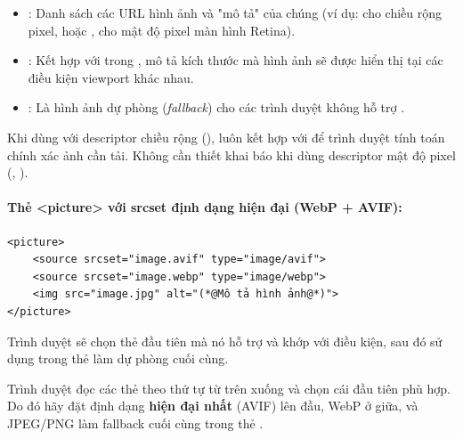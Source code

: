 \begin{itemize}[leftmargin=1.5em, itemsep=3pt, parsep=0pt]
    \item {}: Danh sách các URL hình ảnh và "mô tả" của chúng (ví dụ:  cho chiều rộng pixel, hoặc ,  cho mật độ pixel màn hình Retina).
    \item {}: Kết hợp với  trong , mô tả kích thước mà hình ảnh sẽ được hiển thị tại các điều kiện viewport khác nhau.
    \item {}: Là hình ảnh dự phòng (\textit{fallback}) cho các trình duyệt không hỗ trợ .
\end{itemize}

\begin{tipBox}
Khi dùng  với descriptor chiều rộng (), luôn kết hợp với  để trình duyệt tính toán chính xác ảnh cần tải. Không cần thiết khai báo  khi dùng descriptor mật độ pixel (, ).
\end{tipBox}

\paragraph{Thẻ <picture> với srcset định dạng hiện đại (WebP + AVIF):}

\begin{codeWindow}
\begin{lstlisting}[language=HTML5]
<picture>
    <source srcset="image.avif" type="image/avif">
    <source srcset="image.webp" type="image/webp">
    <img src="image.jpg" alt="(*@Mô tả hình ảnh@*)">
</picture>
\end{lstlisting}
\end{codeWindow}

Trình duyệt sẽ chọn thẻ  đầu tiên mà nó hỗ trợ và khớp với điều kiện, sau đó sử dụng  trong thẻ  làm dự phòng cuối cùng.

\begin{noteBox}
Trình duyệt đọc các thẻ  theo thứ tự từ trên xuống và chọn cái đầu tiên phù hợp. Do đó hãy đặt định dạng \textbf{hiện đại nhất} (AVIF) lên đầu, WebP ở giữa, và JPEG/PNG làm fallback cuối cùng trong thẻ .
\end{noteBox}

